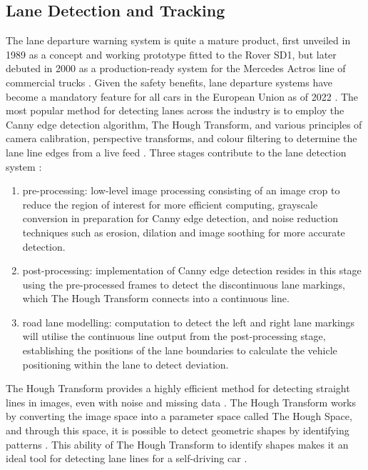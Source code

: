 \documentclass[9pt,conference]{IEEEtran}
\begin{document}
\subsection{Lane Detection and Tracking}

The lane departure warning system is quite a mature product, first unveiled in 1989 as a concept and working prototype fitted to the Rover SD1, but later debuted in 2000 as a production-ready system for the Mercedes Actros line of commercial trucks \cite{b1}. Given the safety benefits, lane departure systems have become a mandatory feature for all cars in the European Union as of 2022 \cite{b1}\cite{b2}. The most popular method for detecting lanes across the industry is to employ the Canny edge detection algorithm, The Hough Transform, and various principles of camera calibration, perspective transforms, and colour filtering to determine the lane line edges from a live feed \cite{b1}. Three stages contribute to the lane detection system \cite{b3}:

\begin{enumerate}[label=\alph*.]
    \item pre-processing: low-level image processing consisting of an image crop to reduce the region of interest for more efficient computing, grayscale conversion in preparation for Canny edge detection, and noise reduction techniques such as erosion, dilation and image soothing for more accurate detection.
    \item post-processing: implementation of Canny edge detection resides in this stage using the pre-processed frames to detect the discontinuous lane markings, which The Hough Transform connects into a continuous line.
    \item road lane modelling: computation to detect the left and right lane markings will utilise the continuous line output from the post-processing stage, establishing the positions of the lane boundaries to calculate the vehicle positioning within the lane to detect deviation.
\end{enumerate}

The Hough Transform provides a highly efficient method for detecting straight lines in images, even with noise and missing data \cite{b4}. The Hough Transform works by converting the image space into a parameter space called The Hough Space, and through this space, it is possible to detect geometric shapes by identifying patterns \cite{b5}. This ability of The Hough Transform to identify shapes makes it an ideal tool for detecting lane lines for a self-driving car \cite{b6}.
\end{document}
